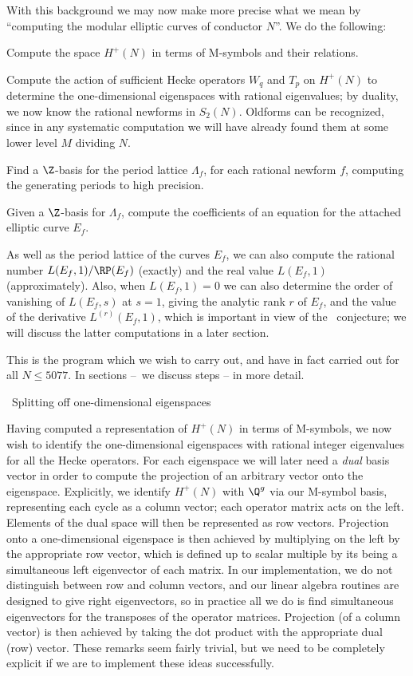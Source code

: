 With this background we may now make more precise what we mean by
``computing the modular elliptic curves of conductor $N$''.   We do
the following:
\roster
\item Compute the space $H^+(N)$ in terms of M-symbols and their relations.
\item Compute the action of sufficient Hecke operators $W_q$ and $T_p$ on
      $H^+(N)$ to determine the one-dimensional eigenspaces with rational
      eigenvalues; by duality, we now know the rational newforms in $S_2(N)$.
      Oldforms can be recognized, since in any systematic computation we will 
      have already found them at some lower level $M$ dividing $N$.
\item Find a $\Z$-basis for the period lattice $\Lambda_f$, for each
      rational newform $f$, computing the generating periods to high precision.
\item Given a $\Z$-basis for $\Lambda_f$, compute the coefficients of an
      equation for the attached elliptic curve $E_f$.
\item As well as the period lattice of the curves $E_f$, we can also
compute the rational number $L(E_f,1)/\RP(E_f)$ (exactly) and the real
value $L(E_f,1)$ (ap\-proxi\-mate\-ly).  Also, when $L(E_f,1)=0$ we
can also determine the order of vanishing of $L(E_f,s)$ at $s=1$,
giving the analytic rank $r$ of $E_f$, and the value of the derivative
$L^{(r)}(E_f,1)$, which is important in view of the \BSD\ conjecture;
we will discuss the latter computations in a later section.

\endroster

This is the program which we wish to carry out, and have in fact carried 
out for all $N\le5077$.   In sections \Split--\Eqns\ we discuss steps 
-- in more detail. 

%
%
\beginsection{\Split}
\head\Split\ Splitting off one-dimensional eigenspaces\endhead

Having computed a representation of $H^+(N)$ in terms of M-symbols, we now 
wish to identify the one-dimensional eigen\-spaces with rational integer 
eigen\-values for all the Hecke operators.   For each eigenspace we will 
later need a {\it dual\/} basis vector in order to compute the projection 
of an arbitrary vector onto the eigenspace.   Explicitly, we identify 
$H^+(N)$ with $\Q^g$ via our M-symbol basis, representing each cycle as a 
column vector; each operator matrix acts on the left.  Elements of the 
dual space will then be represented as row vectors. Projection onto a 
one-dimensional eigenspace is then achieved by multiplying on the left by 
the appropriate row vector, which is defined up to scalar multiple by its 
being a simultaneous left eigenvector of each matrix.  In our 
implementation, we do not distinguish between row and column vectors, and 
our linear algebra routines are designed to give right eigenvectors, so 
in practice all we do is find simultaneous eigenvectors for the 
transposes of the operator matrices.  Projection (of a column vector) is 
then achieved by taking the dot product with the appropriate dual (row) 
vector. These remarks seem fairly trivial, but we need to be completely 
explicit if we are to implement these ideas successfully.

